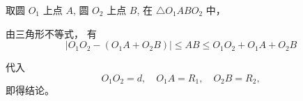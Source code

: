 \begin{proofbox}
取圆 $O_1$ 上点 $A$,
圆 $O_2$ 上点 $B$,
在 $\triangle O_1ABO_2$ 中，

由三角形不等式，
有
\[
|O_1O_2-(O_1A+O_2B)| \le AB \le O_1O_2+O_1A+O_2B
\]

代入
\[
O_1O_2=d,\quad O_1A=R_1,\quad O_2B=R_2,
\]
即得结论。
\end{proofbox}
